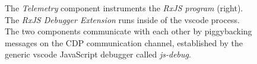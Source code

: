 \begin{figure}
  \caption{The \emph{Telemetry} component instruments the \emph{RxJS program} (right). The \emph{RxJS Debugger Extension} runs inside of the vscode process. The two components communicate with each other by piggybacking messages on the CDP communication channel, established by the generic vscode JavaScript debugger called \emph{js-debug}.}
  \label{fig:architecture}
\end{figure}
